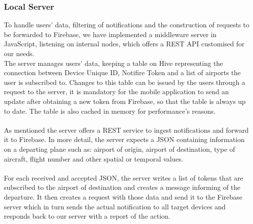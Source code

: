 \subsubsection{Local Server}
To handle users' data, filtering of notifications and the construction of requests to be forwarded to Firebase, we have implemented a middleware server in JavaScript, listening on internal nodes, which offers a REST API customised for our needs.
\\
The server manages users' data, keeping a table on Hive representing the connection between Device Unique ID, Notifire Token and a list of airports the user is subscribed to. Changes to this table can be issued by the users through a request to the server, it is mandatory for the mobile application to send an update after obtaining a new token from Firebase, so that the table is always up to date.
The table is also cached in memory for performance's reasons.
\\ \\
As mentioned the server offers a REST service to ingest notifications and forward it to Firebase. In more detail, the server expects a JSON containing information on a departing plane such as: airport of origin, airport of destination, type of aircraft, flight number and other spatial or temporal values.
\\ \\
For each received and accepted JSON, the server writes a list of tokens that are subscribed to the airport of destination and creates a message informing of the departure. It then creates a request with those data and send it to the Firebase server which in turn sends the actual notification to all target devices and responds back to our server with a report of the action.
